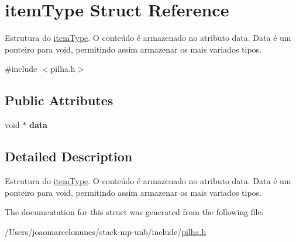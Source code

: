 \hypertarget{structitem_type}{}\section{item\+Type Struct Reference}
\label{structitem_type}


Estrutura do \mbox{\hyperlink{structitem_type}{item\+Type}}. O conteúdo é armazenado no atributo data. Data é um ponteiro para void, permitindo assim armazenar os mais variados tipos.  




{\ttfamily \#include $<$pilha.\+h$>$}

\subsection*{Public Attributes}
\begin{DoxyCompactItemize}
\item 
\mbox{\label{structitem_type_a4b647ae58303eb3ae9efc6eaa6ddbe35}} 
void $\ast$ {\bfseries data}
\end{DoxyCompactItemize}


\subsection{Detailed Description}
Estrutura do \mbox{\hyperlink{structitem_type}{item\+Type}}. O conteúdo é armazenado no atributo data. Data é um ponteiro para void, permitindo assim armazenar os mais variados tipos. 



The documentation for this struct was generated from the following file\+:\begin{DoxyCompactItemize}
\item 
/\+Users/joaomarcelonunes/stack-\/mp-\/unb/include/\mbox{\hyperlink{pilha_8h}{pilha.\+h}}\end{DoxyCompactItemize}
